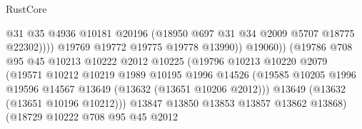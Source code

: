 \begin{lexlean}{RustCore}
\begin{coremodule}
                                                  @31
                                                  @35
                                                  @4936
                                                  @10181
                                                  @20196
                                                  (@18950 @697 @31 @34 @2009 @5707 @18775 @22302))))
                                            @19769
                                            @19772
                                            @19775
                                            @19778
                                            @13990))
                                        @19060))
                                    (@19786
                                      @708
                                      @95
                                      @45
                                      @10213
                                      @10222
                                      @2012
                                      @10225
                                      (@19796
                                        @10213
                                        @10220
                                        @2079
                                        (@19571
                                          @10212
                                          @10219
                                          @1989
                                          @10195
                                          @1996
                                          @14526
                                          (@19585
                                            @10205
                                            @1996
                                            @19596
                                            @14567
                                            @13649
                                            (@13632 (@13651 @10206 @2012)))
                                          @13649
                                          (@13632 (@13651 @10196 @10212)))
                                        @13847
                                        @13850
                                        @13853
                                        @13857
                                        @13862
                                        @13868)
                                      (@18729
                                        @10222
                                        @708
                                        @95
                                        @45
                                        @2012

\end{coremodule}
\end{lexlean}
